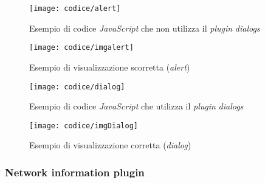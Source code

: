 \begin{figure}[!h] 
    \centering 
    \texttt{[image: codice/alert]} 
    \caption{Esempio di codice \textit{JavaScript} che non utilizza il \textit{plugin} \textit{dialogs}}
\end{figure}

\newpage

\begin{figure}[!h] 
    \centering 
    \texttt{[image: codice/imgalert]} 
    \caption{Esempio di visualizzazione scorretta (\textit{alert})}
\end{figure}

\begin{figure}[!h] 
    \centering 
    \texttt{[image: codice/dialog]} 
    \caption{Esempio di codice \textit{JavaScript} che utilizza il \textit{plugin} \textit{dialogs}}
\end{figure}

\begin{figure}[!h] 
    \centering 
    \texttt{[image: codice/imgDialog]} 
    \caption{Esempio di visualizzazione corretta (\textit{dialog})}
\end{figure}

\subsubsection{Network information plugin}

